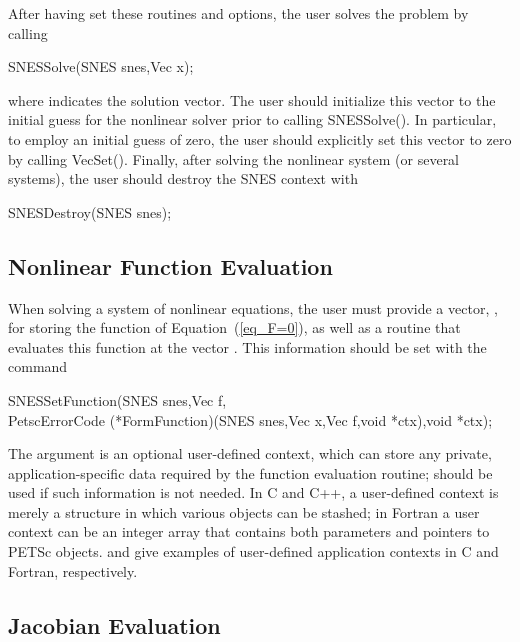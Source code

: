 After having set these routines and options, the user
solves the problem by calling 
\begin{tabbing}
  SNESSolve(SNES snes,Vec x);
\end{tabbing}
where  indicates the solution vector. The user should
initialize this vector to the initial guess for the nonlinear solver
prior to calling SNESSolve().  In particular, to employ an
initial guess of zero, the user should explicitly set this vector to
zero by calling VecSet().  Finally, after solving the nonlinear
system (or several systems), the user should destroy the SNES context
with
\begin{tabbing}
  SNESDestroy(SNES snes);
\end{tabbing}

\subsection{Nonlinear Function Evaluation}
\label{sec_snesfunction}

When solving a system of nonlinear equations, the user must provide
a vector, , for storing the function of
Equation~(\ref{eq_F=0}), as well as a routine that evaluates this
function at the vector .  This information should be set with
the command 
\begin{tabbing}
  SNESSetFunction(SNES snes,Vec f,\\
          PetscErrorCode (*FormFunction)(SNES snes,Vec x,Vec f,void *ctx),void *ctx);
\end{tabbing}
The argument  is an optional user-defined context, which can
store any private, application-specific data required by the
function evaluation routine;  should be used if such information
is not needed.  In C and C++, a user-defined context is merely a
structure in which various objects can be stashed; in Fortran a user
context can be an integer array that contains both parameters and
pointers to PETSc objects.  and
 give examples of user-defined
application contexts in C and Fortran, respectively.

\subsection{Jacobian Evaluation}
\label{sec_snesjacobian}

